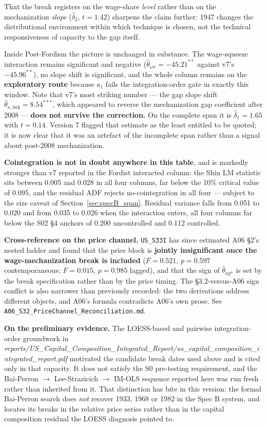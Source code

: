 \documentclass[11pt,a4paper]{article}
\begin{document}
That the break registers on the wage-share \textit{level} rather than on the mechanization \textit{slope} ($\hat{\delta}_2$, $t = 1.42$) sharpens the claim further: 1947 changes the distributional environment within which technique is chosen, not the technical responsiveness of capacity to the gap itself.

Inside Post-Fordism the picture is unchanged in substance. The wage-squeeze interaction remains significant and negative ($\hat{\theta}_{\omega\kappa} = -45.21^{**}$ against v7's $-45.96^{**}$), no slope shift is significant, and the whole column remains on the \textbf{exploratory route} because $\kappa_t$ fails the integration-order gate in exactly this window. Note that v7's most striking number --- the gap slope shift $\hat{\theta}_{\kappa,\text{brk}} = 8.54^{***}$, which appeared to reverse the mechanization gap coefficient after 2008 --- \textbf{does not survive the correction.} On the complete span it is $\hat{\delta}_1 = 1.65$ with $t = 0.14$. Version 7 flagged that estimate as the least entitled to be quoted; it is now clear that it was an artefact of the incomplete span rather than a signal about post-2008 mechanization.

\textbf{Cointegration is not in doubt anywhere in this table}, and is markedly stronger than v7 reported in the Fordist interacted column: the Shin LM statistic sits between 0.005 and 0.028 in all four columns, far below the 10\% critical value of 0.095, and the residual ADF rejects no-cointegration in all four --- subject to the size caveat of Section~\ref{sec:specB_span}. Residual variance falls from 0.051 to 0.020 and from 0.035 to 0.026 when the interaction enters, all four columns far below the S02 \S4 anchors of 0.200 uncontrolled and 0.112 controlled.

\textbf{Cross-reference on the price channel.} \texttt{US\_S33I} has since estimated A06 \S2's nested ladder and found that the price block is \textbf{jointly insignificant once the wage-mechanization break is included} ($F = 0.521$, $p = 0.597$ contemporaneous; $F = 0.015$, $p = 0.985$ lagged), and that the sign of $\hat{\theta}_{\kappa p^{\kappa}}$ is set by the break specification rather than by the price timing. The \S3.2-versus-A06 sign conflict is also narrower than previously recorded: the two derivations address different objects, and A06's formula contradicts A06's own prose. See \texttt{A06\_S32\_PriceChannel\_Reconciliation.md}.

\textbf{On the preliminary evidence.} The LOESS-based and pairwise integration-order groundwork in \textit{reports/US\_Capital\_Composition\_Integrated\_Report/us\_capital\_composition\_integrated\_report.pdf} motivated the candidate break dates used above and is cited only in that capacity. It does not satisfy the S0\* pre-testing requirement, and the Bai-Perron $\to$ Lee-Strazicich $\to$ IM-OLS sequence reported here was run fresh rather than inherited from it. That distinction has bite in this version: the formal Bai-Perron search does \textit{not} recover 1933, 1968 or 1982 in the Spec B system, and locates its breaks in the relative price series rather than in the capital composition residual the LOESS diagnosis pointed to.
\end{document}
